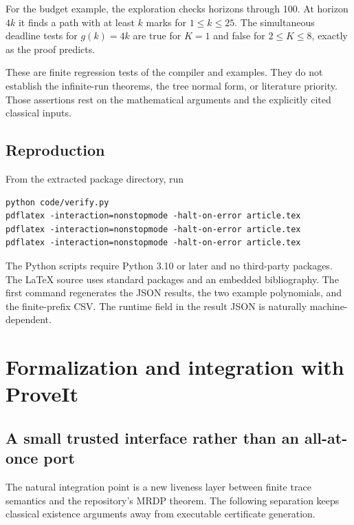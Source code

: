 \documentclass[11pt,letterpaper]{article}
\theoremstyle{definition}
\theoremstyle{remark}
\newcommand{\1}{\mathbf 1}
\begin{document}
For the budget example, the exploration checks horizons through 100. At
horizon $4k$ it finds a path with at least $k$ marks for $1\leq k\leq25$.
The simultaneous deadline tests for $g(k)=4k$ are true for $K=1$ and false for
$2\leq K\leq8$, exactly as the proof predicts.

These are finite regression tests of the compiler and examples. They do not
establish the infinite-run theorems, the tree normal form, or literature
priority. Those assertions rest on the mathematical arguments and the
explicitly cited classical inputs.

\subsection{Reproduction}
From the extracted package directory, run
\begin{lstlisting}
python code/verify.py
pdflatex -interaction=nonstopmode -halt-on-error article.tex
pdflatex -interaction=nonstopmode -halt-on-error article.tex
pdflatex -interaction=nonstopmode -halt-on-error article.tex
\end{lstlisting}
The Python scripts require Python 3.10 or later and no third-party packages.
The LaTeX source uses standard packages and an embedded bibliography.
The first command regenerates the JSON results, the two example polynomials,
and the finite-prefix CSV. The runtime field in the result JSON is naturally
machine-dependent.
\section{Formalization and integration with ProveIt}\label{lbh:sec:formalization}

\subsection{A small trusted interface rather than an all-at-once port}
The natural integration point is a new liveness layer between finite trace
semantics and the repository's MRDP theorem. The following separation keeps
classical existence arguments away from executable certificate generation.
\end{document}
